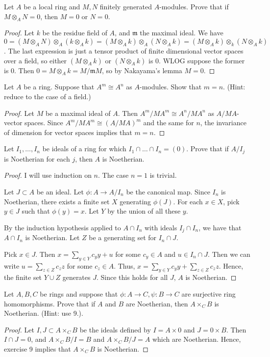 \documentclass{article}
\begin{document}
 Let $A$ be a local ring and $M,N$ finitely generated $A$-modules. Prove that if $M \otimes_A  N = 0$, then $M = 0$ or $N = 0$.
\begin{proof}
Let $k$ be the residue field of $A$, and $\mathfrak{m}$ the maximal ideal.  We have $0 = (M \otimes_A N) \otimes_A (k \otimes_A k) = (M \otimes_A k) \otimes_A (N \otimes_A k) = (M \otimes_A k) \otimes_k (N \otimes_A k)$.  The last expression is just a tensor product of finite dimensional vector spaces over a field, so either $(M \otimes_A k)$ or $(N \otimes_A k)$ is 0.  WLOG suppose the former is 0. Then $0 = M \otimes_A k = M/\mathfrak{m}M$, so by Nakayama's lemma $M = 0$.
\end{proof}

 Let $A$ be a ring. Suppose that $A^m \cong A^n$ as $A$-modules.  Show that $m = n$. (Hint: reduce to the case of a field.)
\begin{proof}
Let $M$ be a maximal ideal of $A$.  Then $A^m/MA^m \cong A^n/MA^n$ as $A/MA$-vector spaces. Since $A^m/MA^m \cong (A/MA)^m$ and the same for $n$, the invariance of dimension for vector spaces implies that $m = n$.
\end{proof}


 Let $I_1, \ldots, I_n$ be ideals of a ring for which $I_1 \cap \ldots \cap I_n = (0)$. Prove that if $A/I_j$ is Noetherian for each $j$, then $A$ is Noetherian.
\begin{proof}
I will use induction on $n$.  The case $n=1$ is trivial.

Let $J \subset A$ be an ideal. Let $\phi: A \to A/I_n$ be the canonical map.  Since $I_n$ is Noetherian, there exists a finite set $X$ generating $\phi(J)$.  For each $x \in X$, pick $y \in J$ such that $\phi(y) = x$.  Let $Y$ by the union of all these $y$.

By the induction hypothesis applied to $A \cap I_n$ with ideals $I_j \cap I_n$, we have that $A \cap I_n$ is Noetherian. Let $Z$ be a generating set for $I_n \cap J$. 

Pick $x \in J$.  Then $x = \sum_{y \in Y} c_y y + u$ for some $c_y \in A$ and $u \in I_n \cap J$.  Then we can write $u = \sum_{z \in Z} c_z z$ for some $c_z \in A$.  Thus, $x = \sum_{y \in Y} c_y y +  \sum_{z \in Z} c_z z$.  Hence, the finite set $Y \cup Z$ generates $J$.  Since this holds for all $J$, $A$ is Noetherian.
\end{proof}

 Let $A, B, C$ be rings and suppose that $\phi: A \to C, \psi: B \to C$ are surjective ring homomorphisms. Prove that if $A$ and $B$ are Noetherian, then $A \times_C B$ is Noetherian. (Hint: use 9.).
\begin{proof}
Let $I,J \subset A \times_C B$ be the ideals defined by $I = A \times 0$ and $J = 0 \times B$. Then $I \cap J = 0$, and $A \times_C B/I = B$ and $A \times_C B/J = A$ which are Noetherian.  Hence, exercise 9 implies that $A \times_C B$ is Noetherian.
\end{proof}
\end{document}
